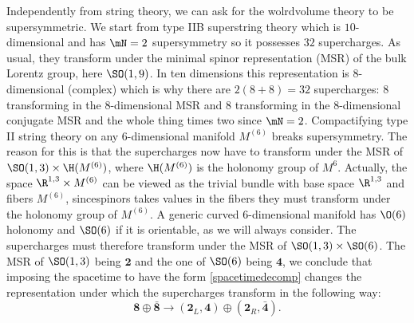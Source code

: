 \documentclass{worksheetclass}
\begin{document}
        Independently from string theory, we can ask for the wolrdvolume theory to be supersymmetric. We start from type IIB superstring theory which is $10$-dimensional and has $\mN=2$ supersymmetry so it possesses $32$ supercharges. As usual, they transform under the minimal spinor representation (MSR) of the bulk Lorentz group, here $\SO(1,9)$. In ten dimensions this representation is $8$-dimensional (complex) which is why there are $2(8+8)=32$ supercharges: $8$ transforming in the $8$-dimensional MSR and $8$ transforming in the $8$-dimensional conjugate MSR and the whole thing times two since $\mN=2$. Compactifying type II string theory on any $6$-dimensional manifold $M^{(6)}$ breaks supersymmetry. The reason for this is that the supercharges now have to transform under the MSR of $\SO(1,3)\times\H(M^{(6)})$, where $\H(M^{(6)})$ is the holonomy group of $M^{6}$. Actually, the space $\R^{1,3}\times M^{(6)}$ can be viewed as the trivial bundle with base space $\R^{1,3}$ and fibers $M^{(6)}$, sincespinors takes values in the fibers they must transform under the holonomy group of $M^(6)$. A generic curved $6$-dimensional manifold has $\O(6)$ holonomy and $\SO(6)$ if it is orientable, as we will always consider. The supercharges must therefore transform under the MSR of $\SO(1,3)\times\SO(6)$. The MSR of $\SO(1,3)$ being $\boldsymbol{2}$ and the one of $\SO(6)$ being $\boldsymbol{4}$, we conclude that imposing the spacetime to have the form \eqref{spacetimedecomp} changes the representation under which the supercharges transform in the following way:
        \begin{equation}
            \boldsymbol{8}\oplus\bar{\boldsymbol{8}}\to (\boldsymbol{2}_L,\boldsymbol{4})\oplus(\boldsymbol{2}_R,\bar{\boldsymbol{4}}).
        \end{equation}
\end{document}
